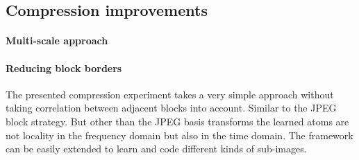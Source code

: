 \subsection{Compression improvements}

\paragraph{Multi-scale approach}
\paragraph{Reducing block borders} The presented compression experiment
takes a very simple approach without taking correlation between adjacent
blocks into account. Similar to the JPEG block strategy. But other than
the JPEG basis transforms the learned atoms are not locality in the frequency
domain but also in the time domain.
The framework can be easily extended to learn and code different
kinds of sub-images.









